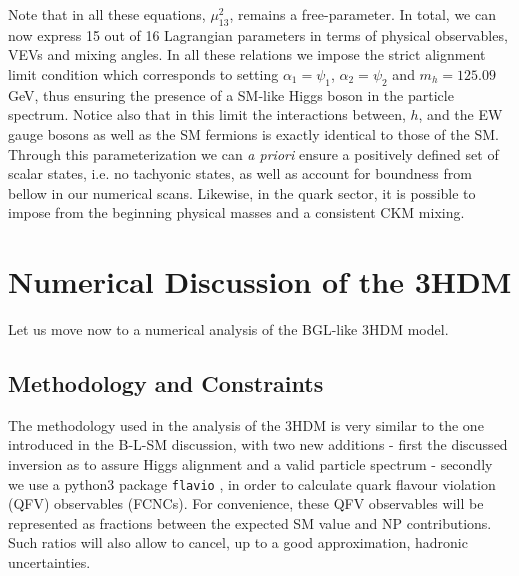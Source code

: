 \documentclass[10pt]{report}
\begin{document}
%

Note that in all these equations, $\mu_{13}^2$, remains a free-parameter. In total, we can now express 15 out of 16 Lagrangian parameters in terms of physical observables, VEVs and mixing angles. 
%
In all these relations we impose the strict alignment limit condition which corresponds to setting $\alpha_1 = \psi_1$, $\alpha_2 = \psi_2$ and $m_h=125.09$ GeV, thus ensuring the presence of a SM-like Higgs boson in the particle spectrum. 
%
Notice also that in this limit the interactions between, $h$, and the EW gauge bosons as well as the SM fermions is exactly identical to those of the  SM. 
%
Through this parameterization we can \textit{a priori} ensure a positively defined set of scalar states, i.e. no tachyonic states, as well as account for boundness from bellow in our numerical scans. 
%
Likewise, in the quark sector, it is possible to impose from the beginning physical masses and a consistent CKM mixing. 

\section{Numerical Discussion of the 3HDM} 

Let us move now to a numerical analysis of the BGL-like 3HDM model. 

\subsection{Methodology and Constraints}

The  methodology used in the analysis of the 3HDM is very similar to the one introduced in the B-L-SM discussion, with two new additions - first the discussed inversion as to assure Higgs alignment and a valid particle spectrum - secondly we use a python3 package \texttt{flavio} \cite{straub2018flavio}, in order to calculate quark flavour violation (QFV) observables (FCNCs). For convenience, these QFV observables will be represented as fractions between the expected SM value and NP contributions. Such ratios will also allow to cancel, up to a good approximation, hadronic uncertainties. 
%
\end{document}
